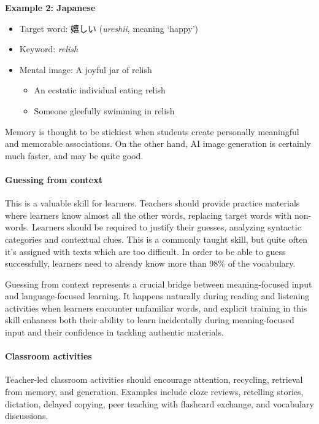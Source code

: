 \begin{tcolorbox}[title=Keyword Technique Examples, colback=white, colframe=blue!75!black, fonttitle=\bfseries]
\textbf{Example 2: Japanese}
\begin{itemize}
    \item Target word: 嬉しい (\textit{ureshii}, meaning `happy')
    \item Keyword: \textit{relish}
    \item Mental image: A joyful jar of relish
    \begin{itemize}
        \item An ecstatic individual eating relish
        \item Someone gleefully swimming in relish 
    \end{itemize}
\end{itemize}

Memory is thought to be stickiest when students create personally meaningful and memorable associations. On the other hand, AI image generation is certainly much faster, and may be quite good.
\end{tcolorbox}
\newpage
\paragraph*{Guessing from context} This is a valuable skill for learners. Teachers should provide practice materials where learners know almost all the other words, replacing target words with non-words. Learners should be required to justify their guesses, analyzing syntactic categories and contextual clues. This is a commonly taught skill, but quite often it's assigned with texts which are too difficult. In order to be able to guess successfully, learners need to already know more than 98\% of the vocabulary.

Guessing from context represents a crucial bridge between meaning-focused input and language-focused learning. It happens naturally during reading and listening activities when learners encounter unfamiliar words, and explicit training in this skill enhances both their ability to learn incidentally during meaning-focused input and their confidence in tackling authentic materials.

\paragraph*{Classroom activities} Teacher-led classroom activities should encourage attention, recycling, retrieval from memory, and generation. Examples include cloze reviews, retelling stories, dictation, delayed copying, peer teaching with flashcard exchange, and vocabulary discussions.

